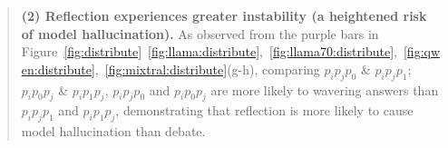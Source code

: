 \documentclass[11pt]{article}
\newcommand{\ie}{\hbox{\emph{i.e.}}\xspace}
\begin{document}
\begin{abstract}
\textbf{
(2) Reflection experiences greater instability (a heightened risk of model hallucination).
} 
As observed from the purple bars in Figure~\ref{fig:distribute}~\ref{fig:llama:distribute},~\ref{fig:llama70:distribute},~\ref{fig:qwen:distribute},~\ref{fig:mixtral:distribute}(g-h), comparing $p_ip_jp_0$ \& $p_ip_jp_1$; $p_ip_0p_j$ \& $p_ip_1p_j$, $p_ip_jp_0$ and $p_ip_0p_j$ are more likely to wavering answers than $p_ip_jp_1$ and $p_ip_1p_j$, demonstrating that reflection is more likely to cause model hallucination than debate. 





\end{abstract}
\end{document}

